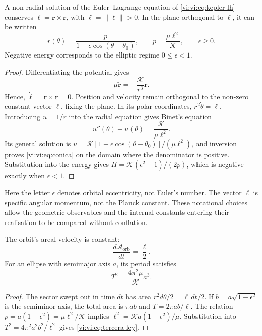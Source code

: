 \begin{proposition}
\label{vi:vi:prop:conica}
A non-radial solution of the Euler--Lagrange equation of
\eqref{vi:vi:eq:kepler-lh} conserves
$\boldsymbol\ell=\mathbf r\times\dot{\mathbf r}$, with
$\ell=\|\boldsymbol\ell\|>0$. In the plane orthogonal to
$\boldsymbol\ell$, it can be written
\begin{equation}
 r(\theta)=\frac{p}{1+\epsilon\cos(\theta-\theta_0)},
 \qquad p=\frac{\mu\ell^2}{\mathcal K},
 \qquad \epsilon\geq0.
 \label{vi:vi:eq:conica}
\end{equation}
Negative energy corresponds to the elliptic regime
$0\leq\epsilon<1$.
\end{proposition}
\begin{proof}
Differentiating the potential gives
\begin{equation}
 \mu\ddot{\mathbf r}=-\frac{\mathcal K}{r^3}\mathbf r.
 \label{vi:vi:eq:fuerza-central}
\end{equation}
Hence,
$\dot{\boldsymbol\ell}=\mathbf r\times\ddot{\mathbf r}=0$.
Position and velocity remain orthogonal to the
non-zero constant vector $\boldsymbol\ell$, fixing the plane.
In its polar coordinates, $r^2\dot\theta=\ell$. Introducing
$u=1/r$ into the radial equation gives Binet's equation
\[
 u''(\theta)+u(\theta)=\frac{\mathcal K}{\mu\ell^2}.
\]
Its general solution is
$u=\mathcal K[1+\epsilon\cos(\theta-\theta_0)]/(\mu\ell^2)$,
and inversion proves \eqref{vi:vi:eq:conica} on the domain
where the denominator is positive. Substitution into
the energy gives
$H=\mathcal K(\epsilon^2-1)/(2p)$, which is negative
exactly when $\epsilon<1$.
\end{proof}

Here the letter $\epsilon$ denotes orbital eccentricity,
not Euler's number. The vector $\boldsymbol\ell$ is
specific angular momentum, not the Planck constant.
These notational choices allow the geometric
observables and the internal constants entering their
realisation to be compared without conflation.

\begin{proposition}
\label{vi:vi:prop:ley-areal}
The orbit's areal velocity is constant:
\begin{equation}
 \frac{d\mathcal A_{\mathrm{orb}}}{dt}=\frac\ell2.
 \label{vi:vi:eq:ley-areal}
\end{equation}
For an ellipse with semimajor axis $a$, its period satisfies
\begin{equation}
 T^2=\frac{4\pi^2\mu}{\mathcal K}a^3.
 \label{vi:vi:eq:tercera-ley}
\end{equation}
\end{proposition}
\begin{proof}
The sector swept out in time $dt$ has area
$r^2d\theta/2=\ell\,dt/2$. If $b=a\sqrt{1-\epsilon^2}$
is the semiminor axis, the total area is $\pi ab$ and
$T=2\pi ab/\ell$. The relation
$p=a(1-\epsilon^2)=\mu\ell^2/\mathcal K$ implies
$\ell^2=\mathcal K a(1-\epsilon^2)/\mu$.
Substitution into $T^2=4\pi^2a^2b^2/\ell^2$ gives
\eqref{vi:vi:eq:tercera-ley}.
\end{proof}

